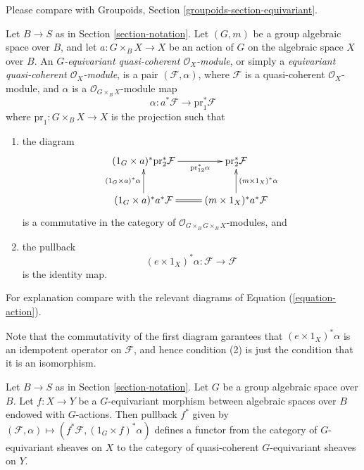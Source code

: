 \noindent
Please compare with
Groupoids, Section \ref{groupoids-section-equivariant}.

\begin{definition}
\label{definition-equivariant-module}
Let $B \to S$ as in Section \ref{section-notation}.
Let $(G, m)$ be a group algebraic space over $B$, and
let $a : G \times_B X \to X$ be an action of $G$
on the algebraic space $X$ over $B$.
An {\it $G$-equivariant quasi-coherent $\mathcal{O}_X$-module},
or simply a {\it equivariant quasi-coherent $\mathcal{O}_X$-module},
is a pair $(\mathcal{F}, \alpha)$, where $\mathcal{F}$ is a quasi-coherent
$\mathcal{O}_X$-module, and $\alpha$ is a $\mathcal{O}_{G \times_B X}$-module
map
$$
\alpha : a^*\mathcal{F} \longrightarrow \text{pr}_1^*\mathcal{F}
$$
where $\text{pr}_1 : G \times_B X \to X$ is the projection
such that
\begin{enumerate}
\item the diagram
$$
\xymatrix{
(1_G \times a)^*\text{pr}_2^*\mathcal{F} \ar[r]_-{\text{pr}_{12}^*\alpha} &
\text{pr}_2^*\mathcal{F} \\
(1_G \times a)^*a^*\mathcal{F} \ar[u]^{(1_G \times a)^*\alpha} \ar@{=}[r] &
(m \times 1_X)^*a^*\mathcal{F} \ar[u]_{(m \times 1_X)^*\alpha}
}
$$
is a commutative in the category of
$\mathcal{O}_{G \times_B G \times_B X}$-modules, and
\item the pullback
$$
(e \times 1_X)^*\alpha : \mathcal{F} \longrightarrow \mathcal{F}
$$
is the identity map.
\end{enumerate}
For explanation compare with the relevant diagrams of
Equation (\ref{equation-action}).
\end{definition}

\noindent
Note that the commutativity of the first diagram garantees that
$(e \times 1_X)^*\alpha$ is an idempotent operator on $\mathcal{F}$,
and hence condition (2) is just the condition that it is an isomorphism.

\begin{lemma}
\label{lemma-pullback-equivariant}
Let $B \to S$ as in Section \ref{section-notation}.
Let $G$ be a group algebraic space over $B$.
Let $f : X \to Y$ be a $G$-equivariant morphism between
algebraic spaces over $B$ endowed with $G$-actions.
Then pullback $f^*$ given by
$(\mathcal{F}, \alpha) \mapsto (f^*\mathcal{F}, (1_G \times f)^*\alpha)$
defines a functor from the category of $G$-equivariant sheaves on
$X$ to the category of quasi-coherent $G$-equivariant sheaves on $Y$.
\end{lemma}

